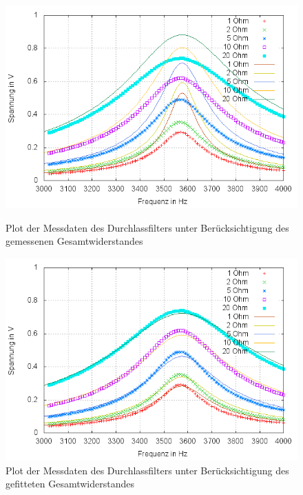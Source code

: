 \begin{figure}
        \includegraphics[width=.9\textwidth]{images/plot/durchlassfilter+theorie+R_ges.png}
\caption{Plot der Messdaten des Durchlassfilters unter Berücksichtigung des gemessenen Gesamtwiderstandes}
\label{plot:durchlass+R_ges}

	\includegraphics[width=.9\textwidth]{images/plot/durchlassfilter+theorie+R_ges-fit.png}
\caption{Plot der Messdaten des Durchlassfilters unter Berücksichtigung des gefitteten Gesamtwiderstandes}
\label{plot:durchlass+R_ges-fit}
\end{figure}
